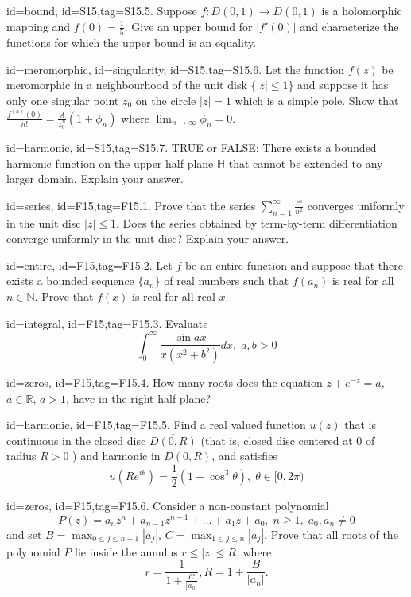 \documentclass[12pt,letterpaper]{article}
\theoremstyle{plain}
\theoremstyle{definition}
\begin{document}
{\item[id=bound, id=S15,tag=S15.5.]
Suppose $f : D(0,1) \rightarrow D(0,1)$ is a holomorphic mapping and $f(0) = \frac{1}{5}$. Give an upper bound for $| f'(0) |$ and characterize the functions for which the upper bound is an equality.

\item[id=meromorphic, id=singularity, id=S15,tag=S15.6.]
Let the function $f(z)$ be meromorphic in a neighbourhood of the unit disk $\{| z | \le 1\}$ and suppose it has only one singular point $z_0$ on the circle $| z | = 1$ which is a simple pole. Show that $\frac{f^{(n)}(0)}{n!} = \frac{A}{z_0^n}(1 + \phi_n)$ where $\lim_{n\rightarrow \infty} \phi_n = 0$.

\item[id=harmonic, id=S15,tag=S15.7.]
TRUE or FALSE: There exists a bounded harmonic function on the upper half plane $\mathbb{H}$ that cannot be extended to any larger domain. Explain your answer.

\item[id=series, id=F15,tag=F15.1.]
Prove that the series $\sum_{n=1}^{\infty} \frac{z^n}{n^2}$ converges uniformly in the unit disc $| z | \le 1$. Does the series obtained by term-by-term differentiation converge uniformly in the unit disc? Explain your answer.
\item[id=entire, id=F15,tag=F15.2.]
Let $f$ be an entire function and suppose that there exists a bounded sequence $\{a_n\}$ of real numbers such that $f(a_n)$ is real for all $n \in \mathbb{N}$. Prove that $f(x)$ is real for all real $x$.
\item[id=integral, id=F15,tag=F15.3.]
Evaluate
\[
	\int_{0}^{\infty} \frac{\sin ax}{x(x^2 + b^2)} dx, \; a,b > 0
\]

\item[id=zeros, id=F15,tag=F15.4.]
How many roots does the equation $z + e^{-z} = a$, $a \in \mathbb{R}$, $a > 1$, have in the right half plane?

\item[id=harmonic, id=F15,tag=F15.5.]
Find a real valued function $u(z)$ that is continuous in the closed disc $\overline{D(0,R)}$ (that is, closed disc centered at 0 of radius $R > 0$ ) and harmonic in $D(0,R)$, and satisfies
\[
	u(Re^{i\theta}) = \frac{1}{2}(1 + \cos^3\theta), \; \theta \in [0,2\pi)
\]
\item[id=zeros, id=F15,tag=F15.6.]
Consider a non-constant polynomial
\[
	P(z) = a_n z^n + a_{n-1} z^{n-1} + \ldots + a_1 z + a_0, \; n \ge 1, \; a_0, a_n \ne 0
\]
and set $B = \max_{0 \le j \le n - 1} | a_j |$, $C = \max_{1 \le j \le n} | a_j |$. Prove that all roots of the polynomial $P$ lie inside the annulus $r \le | z | \le R$, where
\[
	r = \frac{1}{1 + \frac{C}{| a_0 |}}, R = 1 + \frac{B}{| a_n |}.
\]

}
\end{document}

